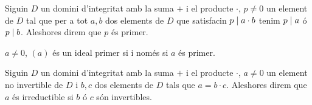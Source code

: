 \documentclass[../Apunts.tex]{subfiles}
\begin{document}
	\begin{definition}[Primer]
		\label{def:primer en un anell}
		Siguin \(D\) un domini d'integritat amb la suma \(+\) i el producte \(\cdot\), \(p\neq0\) un element de \(D\) tal que per a tot \(a,b\) dos elements de \(D\) que satisfacin \(p\mathrel{|} a\cdot b\) tenim \(p\mathrel{|} a\) ó \(p\mathrel{|} b\). Aleshores direm que \(p\) és primer.
	\end{definition}
	\begin{observation}
		\label{obs:ideals primer iff primer}
		\(a\neq0\), \((a)\) és un ideal primer si i només si \(a\) és primer.
	\end{observation}
	\begin{definition}
		\label{def:irreductible en un anell}
		Siguin \(D\) un domini d'integritat amb la suma \(+\) i el producte \(\cdot\), \(a\neq0\) un element no invertible de \(D\) i \(b,c\) dos elements de \(D\) tals que \(a=b\cdot c\). Aleshores direm que \(a\) és irreductible si \(b\) ó \(c\) són invertibles.
	\end{definition}
\end{document}

